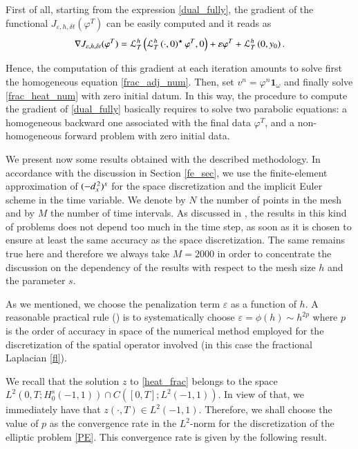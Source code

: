 First of all, starting from the expression \eqref{dual_fully}, the gradient of the functional $J_{\varepsilon,h,\delta t}(\varphi^T)$ can be easily computed and it reads as
\begin{align*}
	\nabla J_{\varepsilon,h,\delta t}(\varphi^T) = \mathcal{L}^h_T\left(\mathcal{L}^h_T\left(\cdot,0\right)^\star\varphi^T,0\right) +  \varepsilon\varphi^T + \mathcal{L}^h_T\left(0,y_0\right).
\end{align*}

Hence, the computation of this gradient at each iteration amounts to solve first the homogeneous equation \eqref{frac_adj_num}. Then, set $v^n=\varphi^n\mathbf{1}_\omega$ and finally solve \eqref{frac_heat_num} with zero initial datum. In this way, the procedure to compute the gradient of \eqref{dual_fully} basically requires to solve two parabolic equations: a homogeneous backward one associated with the final data $\varphi^T$, and a non-homogeneous forward problem with zero initial data. 

We present now some results obtained with the described methodology. In accordance with the discussion in Section \ref{fe_sec}, we use the finite-element approximation of $(-d_x^{\,2})^{s}$ for the space discretization and the implicit Euler scheme in the time variable. We denote by $N$ the number of points in the mesh and by $M$ the number of time intervals. As discussed in \cite{boyer2011uniform}, the results in this kind of problems does not depend too much in the time step, as soon as it is chosen to ensure at least the same accuracy as the space discretization. The same remains true here and therefore we always take $M=2000$ in order to concentrate the discussion on the dependency of the results with respect to the mesh size $h$ and the parameter $s$.

As we mentioned, we choose the penalization term $\varepsilon$ as a function of $h$. A reasonable practical rule (\cite{boyer2013penalised}) is to systematically choose $\varepsilon=\phi(h)\sim h^{2p}$ where $p$ is the order of accuracy in space of the numerical method employed for the discretization of the spatial operator involved (in this case the fractional Laplacian \eqref{fl}).

We recall that the solution $z$ to \eqref{heat_frac} belongs to the space $L^2(0,T;H_0^s(-1,1))\cap C([0,T];L^2(-1,1))$. In view of that, we immediately have that $z(\cdot,T)\in L^2(-1,1)$. Therefore, we shall choose the value of $p$ as the convergence rate in the $L^2$-norm for the discretization of the elliptic problem \eqref{PE}. This convergence rate is given by the following result.

